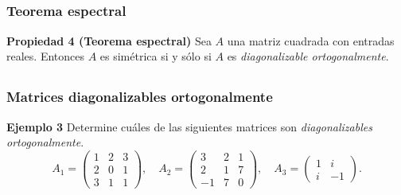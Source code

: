 
\subsection{}

\begin{frame}\frametitle{Teorema espectral}
	
	\begin{prop}{\textbf{Propiedad 4 (Teorema espectral)}}
		\justifying
		Sea $A$ una matriz cuadrada con entradas reales. Entonces $A$ es simétrica si y sólo si $A$ es 
		\textit{diagonalizable ortogonalmente}.			
	\end{prop}	
	
\end{frame}


\subsection{}

\begin{frame}\frametitle{Matrices diagonalizables ortogonalmente}
		
	\begin{ej}{\textbf{Ejemplo 3}} \justifying 
		Determine cuáles de las siguientes matrices son \textit{diagonalizables ortogonalmente}.
		\[
		A_1 =
		\left(
		\begin{array}{rrr}
		 1  & 2 & 3 \\[1mm]
		 2  & 0 & 1 \\[1mm]
		 3  & 1 & 1
		\end{array}
		\right),\quad
		A_2 =
		\left(
		\begin{array}{rrr}
		 3 & 2 & 1 \\[1mm]
		 2 & 1 & 7 \\[1mm]
		-1 & 7 & 0
		\end{array}
		\right),\quad
		A_3 =
		\left(
		\begin{array}{cc}
		1 & i \\[1mm]
		i & -1
		\end{array}
		\right).
		\]	
	\end{ej}
	
\end{frame}

